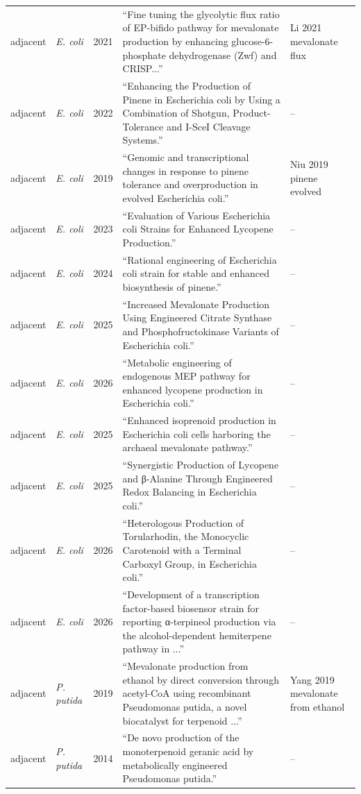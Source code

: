 \begin{landscape}
\begin{longtable}{@{}L{12mm} L{13mm} r L{104mm} L{38mm}@{}}
adjacent & \emph{E. coli} & 2021 & ``Fine tuning the glycolytic flux ratio of EP-bifido pathway for mevalonate production by enhancing glucose-6-phosphate dehydrogenase (Zwf) and CRISP...'' & Li 2021 mevalonate flux \\
adjacent & \emph{E. coli} & 2022 & ``Enhancing the Production of Pinene in Escherichia coli by Using a Combination of Shotgun, Product-Tolerance and I-SceI Cleavage Systems.'' & -- \\
adjacent & \emph{E. coli} & 2019 & ``Genomic and transcriptional changes in response to pinene tolerance and overproduction in evolved Escherichia coli.'' & Niu 2019 pinene evolved \\
adjacent & \emph{E. coli} & 2023 & ``Evaluation of Various Escherichia coli Strains for Enhanced Lycopene Production.'' & -- \\
adjacent & \emph{E. coli} & 2024 & ``Rational engineering of Escherichia coli strain for stable and enhanced biosynthesis of pinene.'' & -- \\
adjacent & \emph{E. coli} & 2025 & ``Increased Mevalonate Production Using Engineered Citrate Synthase and Phosphofructokinase Variants of Escherichia coli.'' & -- \\
adjacent & \emph{E. coli} & 2026 & ``Metabolic engineering of endogenous MEP pathway for enhanced lycopene production in Escherichia coli.'' & -- \\
adjacent & \emph{E. coli} & 2025 & ``Enhanced isoprenoid production in Escherichia coli cells harboring the archaeal mevalonate pathway.'' & -- \\
adjacent & \emph{E. coli} & 2025 & ``Synergistic Production of Lycopene and β-Alanine Through Engineered Redox Balancing in Escherichia coli.'' & -- \\
adjacent & \emph{E. coli} & 2026 & ``Heterologous Production of Torularhodin, the Monocyclic Carotenoid with a Terminal Carboxyl Group, in Escherichia coli.'' & -- \\
adjacent & \emph{E. coli} & 2026 & ``Development of a transcription factor-based biosensor strain for reporting α-terpineol production via the alcohol-dependent hemiterpene pathway in ...'' & -- \\
adjacent & \emph{P. putida} & 2019 & ``Mevalonate production from ethanol by direct conversion through acetyl-CoA using recombinant Pseudomonas putida, a novel biocatalyst for terpenoid ...'' & Yang 2019 mevalonate from ethanol \\
adjacent & \emph{P. putida} & 2014 & ``De novo production of the monoterpenoid geranic acid by metabolically engineered Pseudomonas putida.'' & -- \\

\end{longtable}
\end{landscape}
